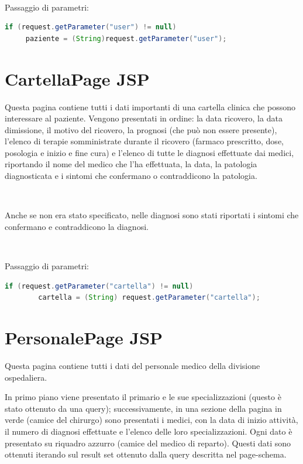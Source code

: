 \documentclass[a4paper,titlepage]{article}
\begin{document}
~

Passaggio di parametri: 

\begin{lstlisting}[language=java]
 if (request.getParameter("user") != null)
	 paziente = (String)request.getParameter("user");

\end{lstlisting}


\section{CartellaPage JSP}

Questa pagina contiene tutti i dati importanti di una cartella clinica che possono interessare al paziente. Vengono presentati in ordine: la data ricovero, la data dimissione, il motivo del ricovero, la prognosi (che può non essere presente), l'elenco di terapie somministrate durante il ricovero (farmaco prescritto, dose, posologia e inizio e fine cura) e l'elenco di tutte le diagnosi effettuate dai medici, riportando il nome del medico che l'ha effettuata, la data, la patologia diagnosticata e i sintomi che confermano o contraddicono la patologia.

~

Anche se non era stato specificato, nelle diagnosi sono stati riportati i sintomi che confermano e contraddicono la diagnosi.

~

Passaggio di parametri: 

\begin{lstlisting}[language=java]
	if (request.getParameter("cartella") != null)
		cartella = (String) request.getParameter("cartella");

\end{lstlisting}

\section{PersonalePage JSP}

Questa pagina contiene tutti i dati del personale medico della divisione ospedaliera.

In primo piano viene presentato il primario e le sue specializzazioni (questo è stato ottenuto da una query); successivamente, in una sezione della pagina in verde (camice del chirurgo) sono presentati i medici, con la data di inizio attività, il numero di diagnosi effettuate e l'elenco delle loro specializzazioni. Ogni dato è presentato su riquadro azzurro (camice del medico di reparto). Questi dati sono ottenuti iterando sul result set ottenuto dalla query descritta nel page-schema.
\end{document}
